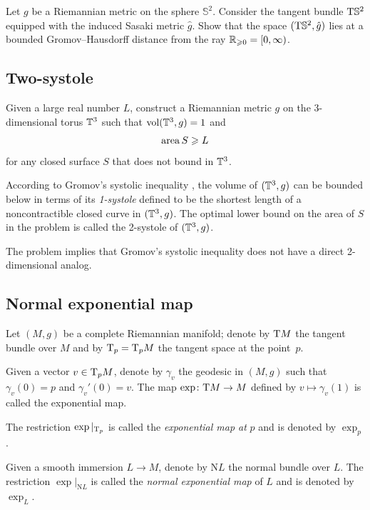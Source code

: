 \begin{pr}
Let $g$ be a Riemannian metric on the sphere $\mathbb{S}^2$.
Consider the tangent bundle $\mathrm{T} \mathbb{S}^2$ 
equipped with the induced Sasaki metric $\hat g$.
Show that
the space $(\mathrm{T} \mathbb{S}^2, \hat g)$ lies at a bounded Gromov--Hausdorff distance from the ray $\mathbb{R}_{\geqslant 0}=[0,\infty)$.
\end{pr}


\subsection*{Two-systole}

\begin{pr} Given a large real number $L$,
construct a Riemannian metric $g$ on the 3-dimensional torus $\mathbb{T}^3$ such that $\operatorname{\rm vol}\nolimits(\mathbb{T}^3,g)=1$
and \[\operatorname{\rm area}\nolimits S\geqslant L\]
for any closed surface $S$ that does not bound in $\mathbb{T}^3$.
\end{pr}

According to Gromov's systolic inequality \cite{gromov-filling,guth2010}, the volume of $(\mathbb{T}^3,g)$ can be bounded below in terms of its \emph{1-systole} defined to be the shortest length of a noncontractible closed curve in $(\mathbb{T}^3,g)$.
The optimal lower bound on the area of $S$ in the problem is called the 2-systole of $(\mathbb{T}^3,g)$.

The problem implies that Gromov's systolic inequality does not have a direct 2-dimensional analog.

\subsection*{Normal exponential map\easy}
\label{Normal exponential map}
\label{page:Normal exponential map}

Let $(M,g)$ be a complete Riemannian manifold;
denote by $\mathrm{T} M$ the tangent bundle over $M$ and by $\mathrm{T}_p=\mathrm{T}_pM$ the tangent space at the point~$p$.

Given a vector $v\in\mathrm{T}_pM$, denote by $\gamma_v$ the geodesic in $(M,g)$
such that $\gamma_v(0)=p$ and $\gamma_v'(0)=v$.
The map $\exp\colon\mathrm{T} M\to M$ defined by $v\mapsto \gamma_v(1)$ is called the exponential map.

The restriction $\exp|_{\mathrm{T}_p}$ is called the \emph{exponential map at} $p$ and is denoted by $\exp_p$.

Given a smooth immersion $L\to M$,
denote by $\mathrm{N} L$ the normal bundle over $L$.
The restriction $\exp|_{\mathrm{N} L}$ is called the {}\emph{normal exponential map} of $L$ and is denoted by $\exp_L$.

